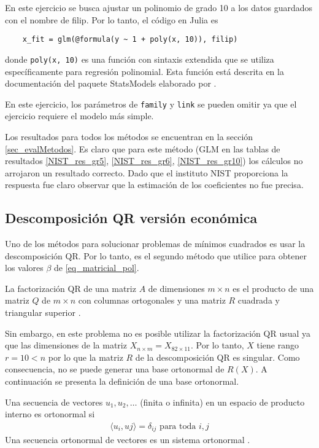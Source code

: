 En este ejercicio se busca ajustar un polinomio de grado 10 a los datos guardados con el nombre de filip. Por lo tanto, el código en Julia es

\begin{verbatim}
    x_fit = glm(@formula(y ~ 1 + poly(x, 10)), filip)
\end{verbatim}

donde \texttt{poly(x, 10)} es una función con sintaxis extendida que se utiliza específicamente para regresión polinomial. Esta función está descrita en la documentación del paquete \textsf{StatsModels} elaborado por \cite{StatsModel_manual}. 

En este ejercicio, los parámetros de \texttt{family} y \texttt{link} se pueden omitir ya que el ejercicio requiere el modelo más simple. 

Los resultados para todos los métodos se encuentran en la sección \ref{sec_evalMetodos}. Es claro que para este método (GLM en las tablas de resultados \ref{NIST_res_gr5}, \ref{NIST_res_gr6}, \ref{NIST_res_gr10}) los cálculos no arrojaron un resultado correcto. Dado que el instituto NIST proporciona la respuesta fue claro observar que la estimación de los coeficientes no fue precisa.

\subsection{Descomposición QR versión económica}

Uno de los métodos para solucionar problemas de mínimos cuadrados es usar la descomposición QR. Por lo tanto, es el segundo método que utilice para obtener los valores $\beta$ de \ref{eq_matricial_pol}.

\begin{definition}
La factorización QR de una matriz $A$ de dimensiones $m \times n$ es el producto de una matriz $Q$ de $m \times n$ con columnas ortogonales y una matriz $R$ cuadrada y triangular superior \cite[p.~191]{garcia2017second}. 
\end{definition}

Sin embargo, en este problema no es posible utilizar la factorización QR usual ya que las dimensiones de la matriz $X_{n \times m} = X_{82 \times 11}$. Por lo tanto, $X$ tiene rango $r = 10 < n$ por lo que la matriz $R$ de la descomposición QR es singular. Como consecuencia, no se puede generar una base ortonormal de $R(X)$. A continuación se presenta la definición de una base ortonormal. 

 \begin{definition}
 Una secuencia de vectores $u_1, u_2, \dots$ (finita o infinita) en un espacio de producto interno es ortonormal si 
 \begin{equation*}
     \begin{aligned}
     \langle u_i , uj \rangle = \delta_{ij} \text{ para toda $i, j$}
     \end{aligned}
 \end{equation*}
 Una secuencia ortonormal de vectores es un sistema ortonormal \cite[p.~147]{garcia2017second}.
 \end{definition}

